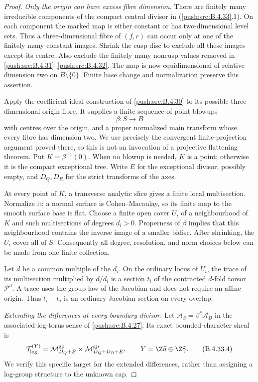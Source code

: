\begin{proof}
\emph{Only the origin can have excess fibre dimension.}
There are finitely many irreducible components
of the compact central divisor in (\ref{push:src:B.4.33}.1).
On each component the marked map is either
constant or has two-dimensional level sets.
Thus a three-dimensional fibre of $(f,r)$
can occur only at one of the finitely many
constant images. Shrink the cusp disc to
exclude all these images except its centre.
Also exclude the finitely many noncusp values
removed in \ref{push:src:B.4.31}--\ref{push:src:B.4.32}. The map is now
equidimensional of relative dimension two
on $B\setminus\{0\}$. Finite base change
and normalization preserve this assertion.

Apply the coefficient-ideal construction of
\ref{push:src:B.4.30} to its possible three-dimensional
origin fibre. It supplies a finite sequence
of point blowups
\[
 \beta:S\longrightarrow B
 \tag{B.4.33.3}
\]
with centres over the origin, and a proper
normalized main transform whose every fibre
has dimension two. We use precisely the
convergent finite-projection argument proved
there, so this is not an invocation of a
projective flattening theorem. Put
$K=\beta^{-1}(0)$. When no blowup is needed,
$K$ is a point; otherwise it is the compact
exceptional tree. Write $E$ for the exceptional
divisor, possibly empty, and $D_Q,D_R$ for
the strict transforms of the axes.

At every point of $K$, a transverse analytic
slice gives a finite local multisection.
Normalize it; a normal surface is
Cohen--Macaulay, so its finite map to the
smooth surface base is flat. Choose a finite
open cover $U_i$ of a neighbourhood of $K$
and such multisections of degrees $d_i>0$.
Properness of $\beta$ implies that this
neighbourhood contains the inverse image
of a smaller bidisc. After shrinking, the
$U_i$ cover all of $S$. Consequently all
degree, resolution, and norm choices below
can be made from one finite collection.

Let $d$ be a common multiple of the $d_i$.
On the ordinary locus of $U_i$, the trace
of its multisection multiplied by $d/d_i$
is a section $t_i$ of the contracted
$d$-fold torsor $\mathscr P^d$. A trace
uses the group law of the Jacobian and
does not require an affine origin. Thus
$t_i-t_j$ is an ordinary Jacobian section
on every overlap.

\emph{Extending the differences at every boundary divisor.}
Let $\mathcal A_S=\beta^*\mathcal A_B$ in
the associated-log-torus sense of \ref{push:src:B.4.27}.
Its exact bounded-character sheaf is
\[
 \mathcal T_{\log}^{(Y)}
  =\mathcal M_{D_Q+E}^{\rm gp}
        \times\mathcal M_{D_Q+D_R+E}^{\rm gp},
 \qquad Y=\Z\widehat u\oplus\Z\widehat\gamma.
 \tag{B.4.33.4}
\]
We verify this specific target for the
extended differences, rather than assigning
a log-group structure to the unknown cap.


\end{proof}
